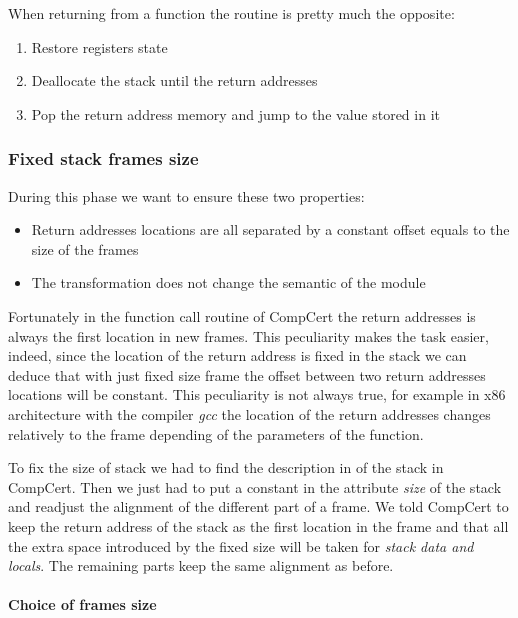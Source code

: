 \documentclass[11pt]{sdm}
\begin{document}
When returning from a function the routine is pretty much the opposite:
\begin{enumerate}
	\item Restore registers state
	\item Deallocate the stack until the return addresses
	\item Pop the return address memory and jump to the value stored in it
\end{enumerate}


\subsubsection{Fixed stack frames size}
\label{sub:Fixed stack frames size}
During this phase we want to ensure these two properties:
\begin{itemize}[noitemsep]
	\item Return addresses locations are all separated by a constant offset equals to the size of the frames
	\item The transformation does not change the semantic of the module 
\end{itemize}

Fortunately in the function call routine of CompCert the return addresses is always the first location in new frames. This peculiarity makes the task easier, indeed, since the location of the return address is fixed in the stack we can deduce that with just fixed size frame the offset between two return addresses locations will be constant.
This peculiarity is not always true, for example in x86 architecture with the compiler \textit{gcc} the location of the return addresses changes relatively to the frame depending of the parameters of the function.

To fix the size of stack we had to find the description in of the stack in CompCert. Then we just had to put a constant in the attribute \textit{size} of the stack and readjust the alignment of the different part of a frame. We told CompCert to keep the return address of the stack as the first location in the frame and that all the extra space introduced by the fixed size will be taken for  \textit{stack data and locals}. The remaining parts keep the same alignment as before.

\paragraph{Choice of frames size}
\label{par:Choice of frames size}
\end{document}
